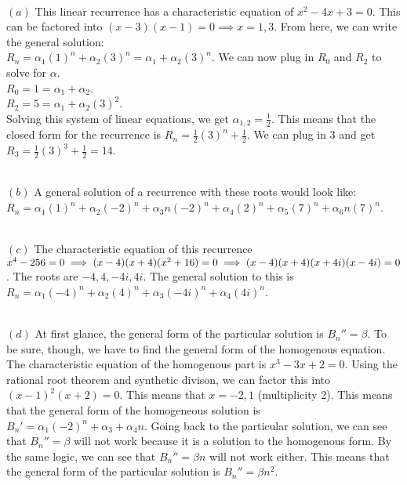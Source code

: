 \documentclass[11pt]{article}
\begin{document}
\begin{solution} \\
	$(a)$ 
		This linear recurrence has a characteristic equation of $x^2 - 4x + 3 = 0$. This can be factored into $(x-3)(x-1) = 0 \implies x = 1, 3$. From here, we can write the general solution: \\ $R_n = \alpha_1(1)^n + \alpha_2(3)^n = \alpha_1 + \alpha_2(3)^n$. We can now plug in $R_0$ and $R_2$ to solve for $\alpha$. \\ $R_0 = 1 = \alpha_1 + \alpha_2$. \\ $R_2 = 5 = \alpha_1 + \alpha_2(3)^2$. \\ Solving this system of linear equations, we get $\alpha_{1,2} = \frac{1}{2}$. This means that the closed form for the recurrence is $R_n = \frac{1}{2}(3)^n + \frac{1}{2}$. We can plug in 3 and get $R_3 = \frac{1}{2}(3)^3 + \frac{1}{2} = 14$. 

	\text{}\\
	$(b)$
		A general solution of a recurrence with these roots would look like: \\ \text{}\quad\quad $R_n = \alpha_1(1)^n + \alpha_2(-2)^n + \alpha_3n(-2)^n + \alpha_4(2)^n + \alpha_5(7)^n + \alpha_6n(7)^n$.

	\text{}\\
	$(c)$
		The characteristic equation of this recurrence $x^4 - 256 = 0 \implies (x-4)(x+4)(x^2+16)=0 \\\implies (x-4)(x+4)(x+4i)(x-4i)=0$. The roots are $-4, 4, -4i, 4i$. The general solution to this is $R_n = \alpha_1(-4)^n + \alpha_2(4)^n + \alpha_3(-4i)^n + \alpha_4(4i)^n$.

	\text{}\\
	$(d)$
		At first glance, the general form of the particular solution is $B_n'' = \beta$. To be sure, though, we have to find the general form of the homogenous equation. The characteristic equation of the homogenous part is $x^3 - 3x + 2 = 0$. Using the rational root theorem and synthetic divison, we can factor this into $(x-1)^2(x+2)=0$. This means that $x = -2, 1$ (multiplicity 2). This means that the general form of the homogeneous solution is $B_n' = \alpha_1 (-2)^n + \alpha_3 + \alpha_4n$. Going back to the particular solution, we can see that $B_n'' = \beta$ will not work because it is a solution to the homogenous form. By the same logic, we can see that $B_n'' = \beta n$ will not work either. This means that the general form of the particular solution is $B_n'' = \beta n^2$.

	\end{solution}
\end{document}
